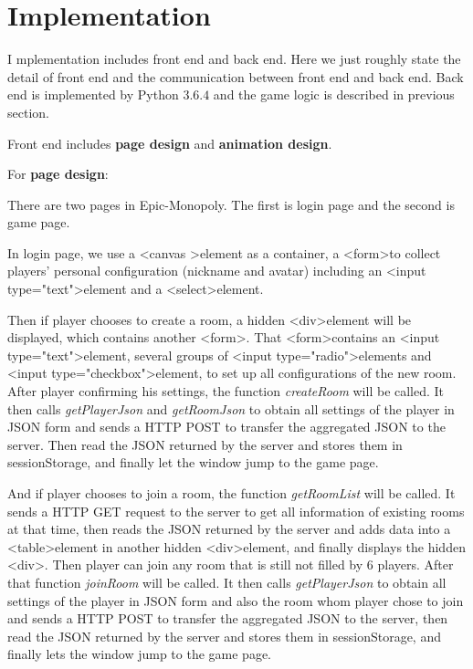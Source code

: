 \documentclass[a4paper,12pt]{article}
\begin{document}
\section{Implementation}
\lettrine[lines=2,loversize=0.35,lraise=0.07,findent=3pt,nindent=2pt]{I}{}
mplementation includes front end and back end. Here we just roughly state the detail of front end and the communication between front end and back end. Back end is implemented by Python $3.6.4$ and the game logic is described in previous section.


Front end includes \textbf{page design} and \textbf{animation design}. 

For \textbf{page design}:

There are two pages in Epic-Monopoly. The first is login page and the second is game page. 
	
In login page, we use a \textless canvas \textgreater element as a container, a \textless form\textgreater to collect players' personal configuration (nickname and avatar) including an \textless input type="text"\textgreater element and a \textless select\textgreater element. 

Then if player chooses to create a room, a hidden \textless div\textgreater element will be displayed, which contains another \textless form\textgreater. That \textless form\textgreater contains an \textless input type="text"\textgreater element, several groups of \textless input type="radio"\textgreater elements and \textless input type="checkbox"\textgreater element, to set up all configurations of the new room. After player confirming his settings, the function \emph{createRoom} will be called. It then calls \emph{getPlayerJson} and \emph{getRoomJson} to obtain all settings of the player in JSON form and sends a HTTP POST to transfer the aggregated JSON to the server. Then read the JSON returned by the server and stores them in sessionStorage, and finally let the window jump to the game page.

And if player chooses to join a room, the function \emph{getRoomList} will be called. It sends a HTTP GET request to the server to get all information of existing rooms at that time, then reads the JSON returned by the server and adds data into a \textless table\textgreater element in another hidden \textless div\textgreater element, and finally displays the hidden \textless div\textgreater. Then player can join any room that is still not filled by $6$ players. After that function \emph{joinRoom} will be called. It then calls \emph{getPlayerJson} to obtain all settings of the player in JSON form and also the room whom player chose to join and sends a HTTP POST to transfer the aggregated JSON to the server, then read the JSON returned by the server and stores them in sessionStorage, and finally lets the window jump to the game page.
	
\end{document}
